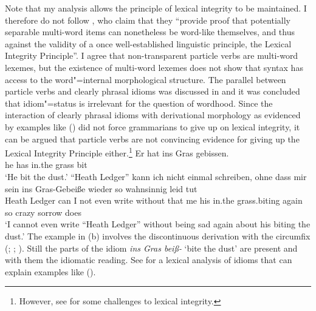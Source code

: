 \begin{exe}
\begin{xlist}[iv.]
\begin{exe}
\begin{xlist}[iv.]
Note that my analysis allows the principle of lexical integrity to be maintained. I therefore do
not follow \citet*[]{CSP2010a}, who claim that they ``provide proof that potentially
  separable multi-word items can nonetheless be word-like themselves, and thus against the validity
  of a once well-established linguistic principle, the Lexical Integrity Principle''. I agree that
non-transparent particle verbs are multi-word lexemes, but the existence of multi-word lexemes does
not show that syntax has access to the word"=internal morphological structure. The parallel between
particle verbs and clearly phrasal idioms was discussed in  and it
was concluded that idiom"=status is irrelevant for the question of wordhood. Since the interaction of
clearly phrasal idioms with derivational morphology as evidenced by examples like () did not
force grammarians to give up on lexical integrity, it can be argued that particle verbs are not
convincing evidence for giving up the Lexical Integrity Principle either.\footnote{
  However, see  for some challenges to lexical integrity.
}
\eal
\ex
\gll Er hat ins Gras gebissen.\\
     he has in.the grass bit\\
\glt `He bit the dust.'
\ex 
\gll "`Heath Ledger"' kann ich nicht einmal schreiben, ohne dass mir sein ins Gras-Gebeiße wieder so
wahnsinnig leid tut%
\footnotemark\\
    \spacebr{}Heath Ledger can I not even write without that me his in.the grass.biting again so
    crazy sorrow does\\
\glt `I cannot even write ``Heath Ledger'' without being sad again about his biting the dust.'
\zl
The example in (b) involves the discontinuous derivation with the circumfix \gee
(\citealp[Section~3.4.3]{Luedeling2001a}; \citealp[--327, 372--377]{Mueller2002b};
\citealp[Section~2.2.1, Section~5.2.1]{Mueller2003a}). Still the parts of the idiom \emph{ins Gras
  beiß-} `bite the dust' are present and with them the idiomatic reading. See  for a lexical analysis of idioms that can
explain examples like ().



\end{xlist}
\end{exe}
\end{xlist}
\end{exe}

